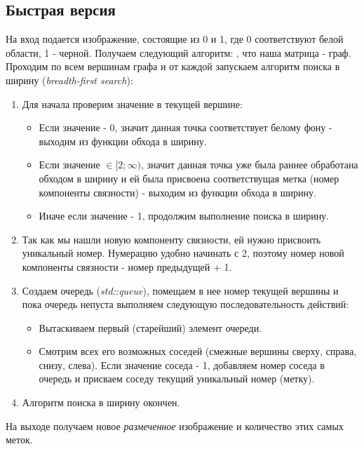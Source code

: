 \documentclass{report}
\begin{document}
\subsection*{Быстрая версия}
\par На вход подается изображение, состоящие из 0 и 1, где 0 соответствуют белой области, 1 - черной. Получаем следующий алгоритм:
, что наша матрица - граф. Проходим по всем вершинам графа и от каждой запускаем алгоритм поиска в ширину
(\textit{breadth-first search}):
\begin{enumerate}
\item Для начала проверим значение в текущей вершине: 
\begin{itemize}
\item Если значение - 0, значит данная точка соответствует белому фону - выходим из функции обхода в ширину.
\item Если значение \begin{math} \in[2; \infty ) \end{math}, значит данная точка уже была раннее обработана обходом в ширину и ей была присвоена соответствущая метка (номер компоненты связности) - выходим из функции обхода в ширину.
\item Иначе если значение - 1, продолжим выполнение поиска в ширину.
\end{itemize}
\item Так как мы нашли новую компоненту связности, ей нужно присвоить уникальный номер. Нумерацию удобно начинать с 2, поэтому номер новой компоненты связности - номер предыдущей + 1.
\item Создаем очередь (\textit{std::queue}), помещаем в нее номер текущей вершины и пока очередь непуста выполняем следующую последовательность действий:
\begin{itemize}
\item Вытаскиваем первый (старейший) элемент очереди.
\item Смотрим всех его возможных соседей (смежные вершины сверху, справа, снизу, слева). Если значение соседа - 1, добавляем номер соседа в очередь и присваем соседу текущий уникальный номер (метку).
\end{itemize}
\item Алгоритм поиска в ширину окончен.
\end{enumerate}
\par На выходе получаем новое \textit{размеченное} изображение и количество этих самых меток.
\end{document}
